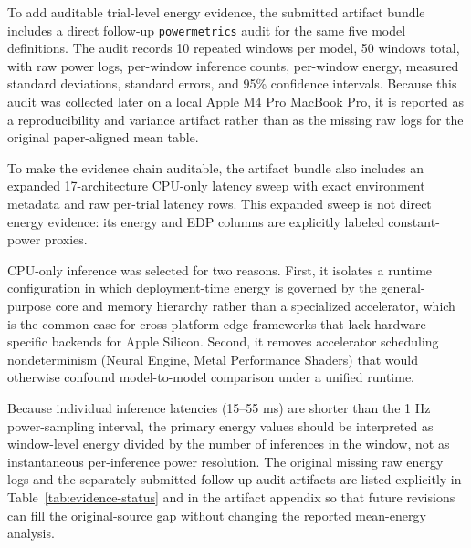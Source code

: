 \documentclass{svproc}
\begin{document}
To add auditable trial-level energy evidence, the submitted artifact bundle
includes a direct follow-up \texttt{powermetrics} audit for the same five
model definitions. The
audit records 10 repeated windows per model, 50 windows total, with raw power
logs, per-window inference counts, per-window energy, measured standard
deviations, standard errors, and 95\% confidence intervals. Because this audit
was collected later on a local Apple M4 Pro MacBook Pro, it is reported as a
reproducibility and variance artifact rather than as the missing raw logs for
the original paper-aligned mean table.

To make the evidence chain auditable, the artifact bundle also includes an expanded
17-architecture CPU-only latency sweep with exact environment metadata and raw
per-trial latency rows. This expanded sweep is not direct energy evidence:
its energy and EDP columns are explicitly labeled constant-power proxies.

CPU-only inference was selected for two reasons. First, it isolates a runtime
configuration in which deployment-time energy is governed by the general-purpose
core and memory hierarchy rather than a specialized accelerator, which is the
common case for cross-platform edge frameworks that lack hardware-specific
backends for Apple Silicon. Second, it removes accelerator scheduling
nondeterminism (Neural Engine, Metal Performance Shaders) that would otherwise
confound model-to-model comparison under a unified runtime.

Because individual inference latencies (15--55 ms) are shorter than the 1 Hz
power-sampling interval, the primary energy values should be interpreted as
window-level energy divided by the number of inferences in the window, not as
instantaneous per-inference power resolution. The original missing raw energy
logs and the separately submitted follow-up audit artifacts are listed
explicitly in Table~\ref{tab:evidence-status} and in the artifact
appendix so that future revisions can fill the original-source gap without
changing the reported mean-energy analysis.
\end{document}
